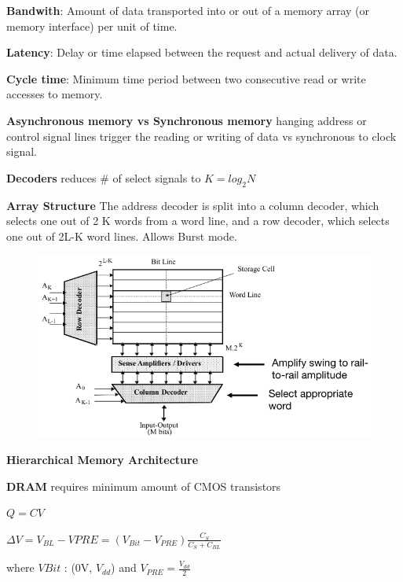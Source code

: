 \documentclass[english]{latex4ei/latex4ei_sheet}
\begin{document}
\textbf{Bandwith}: Amount of data transported into or out of a memory array (or
memory interface) per unit of time.

\textbf{Latency}: Delay or time elapsed between the request and actual delivery of data.

\textbf{Cycle time}: Minimum time period between two consecutive read or write accesses
to memory.

\textbf{Asynchronous memory vs Synchronous memory} hanging address or
control signal lines trigger the reading or writing of data vs synchronous to clock signal.

\textbf{Decoders} reduces \# of select signals to $K = log_2 N$

\textbf{Array Structure} The address decoder is split into a column decoder, which selects one out of 2 K words from a word line, and a row decoder, which selects one out of 2L-K word lines. Allows Burst mode.
\begin{figure}
	\centering
	\includegraphics[width=1\linewidth]{images//5.Memory/ArrayStructure.png}
\end{figure}

\textbf{Hierarchical Memory Architecture}

\textbf{DRAM} requires minimum amount of CMOS transistors

$Q = C V$

$\Delta V = V_{BL} - V{PRE} = (V_{Bit} - V_{PRE})\frac{C_S}{C_S + C_{BL}}$

where $V{Bit}$ : (0V, $V_{dd}$) and $V_{PRE} = \frac{V_{dd}}{2}$
\end{document}
